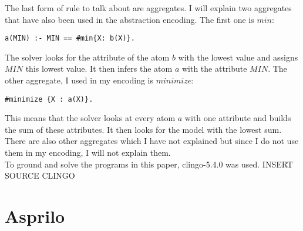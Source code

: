 \documentclass[runningheads]{llncs}
\begin{document}
The last form of rule to talk about are aggregates. I will explain two aggregates that have also been used in the abstraction encoding. The first one is $min$:
\begin{verbatim}
a(MIN) :- MIN == #min{X: b(X)}.
\end{verbatim}
The solver looks for the attribute of the atom $b$ with the lowest value and assigns  $MIN$ this lowest value. It then infers the atom $a$ with the attribute $MIN$. The other aggregate, I used in my encoding is $minimize$:
\begin{verbatim}
#minimize {X : a(X)}.
\end{verbatim}
This means that the solver looks at every atom $a$ with one attribute and builds the sum of these attributes. It then looks for the model with the lowest sum. \\
There are also other aggregates which I have not explained but since I do not use them in my encoding, I will not explain them. \\
To ground and solve the programs in this paper, clingo-5.4.0 was used. INSERT SOURCE CLINGO



\section{Asprilo}
\end{document}
